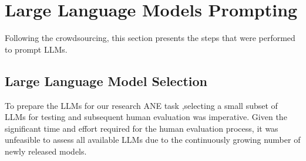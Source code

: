 \section{Large Language Models Prompting}
Following the crowdsourcing, this section presents the steps that were performed to prompt LLMs.
\subsection{Large Language Model Selection}
To prepare the LLMs for our research ANE task 
,selecting a small subset of LLMs for testing and subsequent human evaluation was imperative. Given the significant time and effort required for the human evaluation process, it was unfeasible to assess all available LLMs due to the continuously growing number of newly released models.

